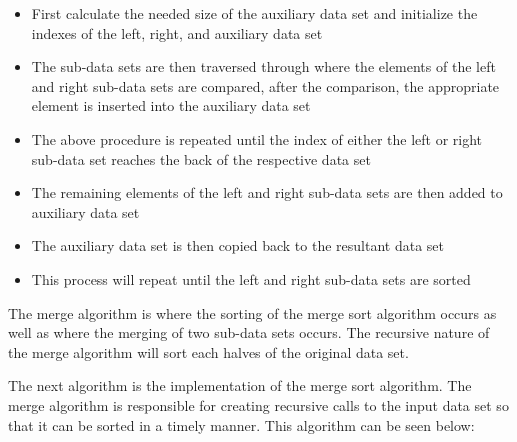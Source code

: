 \begin{highlight}
\begin{itemize}
    \item First calculate the needed size of the auxiliary data set and initialize the indexes of the left, right, and auxiliary data set
    \item The sub-data sets are then traversed through where the elements of the left and right sub-data sets are compared, after the comparison, the appropriate element is inserted into the auxiliary data set
    \item The above procedure is repeated until the index of either the left or right sub-data set reaches the back of the respective data set
    \item The remaining elements of the left and right sub-data sets are then added to auxiliary data set
    \item The auxiliary data set is then copied back to the resultant data set
    \item This process will repeat until the left and right sub-data sets are sorted
\end{itemize}

\noindent The merge algorithm is where the sorting of the merge sort algorithm occurs as well as where the merging of two sub-data sets occurs. The recursive nature of the merge algorithm will sort each halves of the original data set. 

\end{highlight}

The next algorithm is the implementation of the merge sort algorithm. The merge algorithm is responsible for creating recursive calls to the input data set so that it can be sorted in a timely manner. This algorithm can be seen below:


